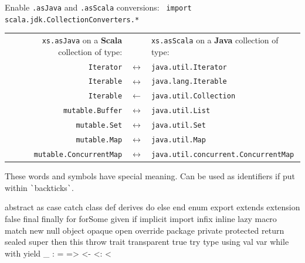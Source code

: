 \documentclass[article, a5paper]{memoir}
\newcommand{\LangColor}{red}
\newcommand{\head}[1]{{\bfseries {\color{\LangColor}{#1}}\par\vspace{1mm}\hrule\vspace{-2mm}}}
\newcommand{\code}{\lstinline[basicstyle=\ttfamily]}
\newcommand{\Newline}{\vspace{\baselineskip}}
\begin{document}
{\small
Enable \code{.asJava} and \code{.asScala} conversions: \code{ import scala.jdk.CollectionConverters.* }
\vspace*{0.2em}

\begin{tabular}{@{}r c l}
\texttt{xs.asJava} on a \textbf{Scala} collection of type: & & \texttt{xs.asScala} on a \textbf{Java} collection of type: \\
\texttt{Iterator} &               $\longleftrightarrow$ & \texttt{java.util.Iterator} \\
\texttt{Iterable} &               $\longleftrightarrow$ & \texttt{java.lang.Iterable} \\
\texttt{Iterable} &               $\leftarrow$ & \texttt{java.util.Collection} \\
\texttt{mutable.Buffer} &         $\longleftrightarrow$  & \texttt{java.util.List} \\
\texttt{mutable.Set} &            $\longleftrightarrow$  & \texttt{java.util.Set} \\
\texttt{mutable.Map} &            $\longleftrightarrow$  & \texttt{java.util.Map} \\
\texttt{mutable.ConcurrentMap} &  $\longleftrightarrow$  & \texttt{java.util.concurrent.ConcurrentMap} \\\end{tabular}
}

\Newline\vspace*{-0.5em}\head{Reserved words}\Newline%

{\small These words and symbols have special meaning. Can be used as identifiers if put within \verb|`|backticks\verb|`|.}
\vspace*{-0.5em}
\begin{Code}[morekeywords={macro,\_},otherkeywords={>,<-,\%,<,>:,@,:,=,\#},basicstyle=\ttfamily\fontsize{8}{9}\selectfont]
abstract as case catch class def derives do else end enum export extends extension false 
final finally for forSome given if implicit import infix inline lazy macro match new null 
object opaque open override package private protected return sealed super then this throw 
trait transparent true try type using val var while with yield
 _   :   =   =>   <-   <:   <%
\end{Code}



\end{document}

